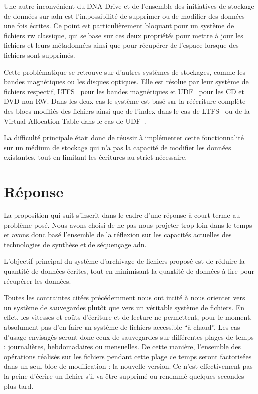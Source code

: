 \documentclass[a4paper]{report}
\makeatletter
\newcommand{\ltfs}{LTFS~\cite{pease2010linear}\@\xspace}
\newcommand{\udf}{UDF~\cite{optical2003universal}\@\xspace}
\makeatother
\begin{document}
Une autre inconvénient du DNA-Drive et de l'ensemble des initiatives
de stockage de données sur \ac{adn} est l'impossibilité de supprimer
ou de modifier des données une fois écrites.
Ce point est particulièrement bloquant pour un système de fichiers \ac{rw} classique,
qui se base sur ces deux propriétés pour mettre à jour les fichiers et leurs métadonnées
ainsi que pour récupérer de l'espace lorsque des fichiers sont supprimés.

Cette problématique se retrouve sur d'autres systèmes de stockages,
comme les bandes magnétiques ou les disques optiques.
Elle est résolue par leur système de fichiers respectif,
\ltfs pour les bandes magnétiques et \udf pour les CD et DVD non-RW.
Dans les deux cas le système est basé sur la réécriture complète des blocs modifiés des fichiers
ainsi que de l'index dans le cas de \ltfs ou de la Virtual Allocation Table dans le cas de \udf.

La difficulté principale était donc de réussir à implémenter cette fonctionnalité
sur un médium de stockage qui n'a pas la capacité de modifier les données existantes,
tout en limitant les écritures au strict nécessaire.


\section{Réponse}

La proposition qui suit s'inscrit dans le cadre d'une réponse à court terme au problème posé.
Nous avons choisi de ne pas nous projeter trop loin dans le temps
et avons donc basé l'ensemble de la réflexion sur les capacités actuelles
des technologies de synthèse et de séquençage \ac{adn}.

L'objectif principal du système d'archivage de fichiers proposé
est de réduire la quantité de données écrites,
tout en minimisant la quantité de données à lire pour récupérer les données.

Toutes les contraintes citées précédemment nous ont incité %
à nous orienter vers un système de sauvegardes plutôt que vers un véritable système de fichiers.
En effet, les vitesses et coûts d'écriture et de lecture ne permettent, pour le moment,
absolument pas d'en faire un système de fichiers accessible ``à chaud''.
Les cas d'usage envisagés seront donc ceux de sauvegardes sur différentes plages de temps :
journalières, hebdomadaires ou mensuelles.
De cette manière, l'ensemble des opérations réalisés sur les fichiers pendant cette plage de temps
seront factorisées dans un seul bloc de modification : la nouvelle version.
Ce n'est effectivement pas la peine d'écrire un fichier
s'il va être supprimé ou renommé quelques secondes plus tard.
\end{document}
